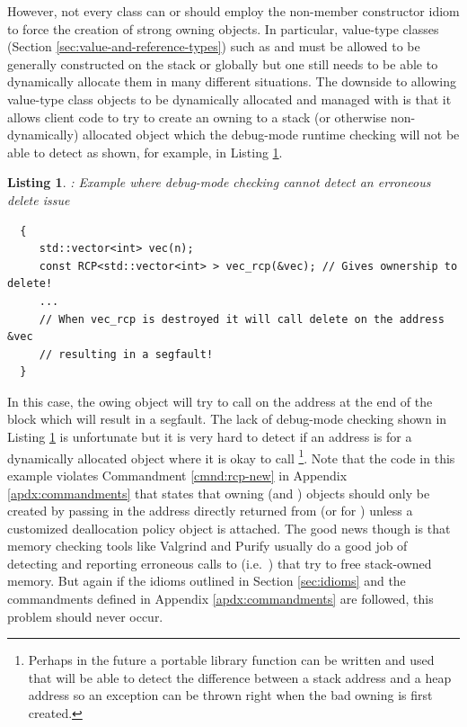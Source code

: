 \documentclass[pdf,ps2pdf,11pt]{SANDreport}
\newtheorem{listing}{Listing}
\begin{document}
However, not every class can or should employ the non-member
constructor idiom to force the creation of strong owning {}
objects.  In particular, value-type classes (Section
{}\ref{sec:value-and-reference-types}) such as {} and
{} must be allowed to be generally constructed on
the stack or globally but one still needs to be able to dynamically
allocate them in many different situations.  The downside to allowing
value-type class objects to be dynamically allocated and managed with
{} is that it allows client code to try to create an owning
{} to a stack (or otherwise non-dynamically) allocated object
which the debug-mode runtime checking will not be able to detect as
shown, for example, in Listing {}\ref{listing:bad-delete-error}.


{}\begin{listing}: Example where debug-mode checking cannot detect an
erroneous delete issue
\label{listing:bad-delete-error}
{\small\begin{verbatim}
  {
     std::vector<int> vec(n);
     const RCP<std::vector<int> > vec_rcp(&vec); // Gives ownership to delete!
     ...
     // When vec_rcp is destroyed it will call delete on the address &vec
     // resulting in a segfault!
  }
\end{verbatim}}
\end{listing}


In this case, the owing {} object will try
to call {} on the address {} at the end of the
block which will result in a segfault.  The lack of debug-mode
checking shown in Listing {}\ref{listing:bad-delete-error} is
unfortunate but it is very hard to detect if an address is for a
dynamically allocated object where it is okay to call
{}\footnote{Perhaps in the future a portable library
function can be written and used that will be able to detect the
difference between a stack address and a heap address so an exception
can be thrown right when the bad owning {} is first created.
}.  Note that the code in this example violates Commandment
{}\ref{cmnd:rcp-new} in Appendix {}\ref{apdx:commandments} that states
that owning {} (and {}) objects should only be
created by passing in the address directly returned from {}
(or {} for {}) unless a customized
deallocation policy object is attached.  The good news though is that
memory checking tools like Valgrind and Purify usually do a good job
of detecting and reporting erroneous calls to {} (i.e.\
{}) that try to free stack-owned memory.  But again if
the idioms outlined in Section {}\ref{sec:idioms} and the commandments
defined in Appendix {}\ref{apdx:commandments} are followed, this
problem should never occur.
\end{document}
